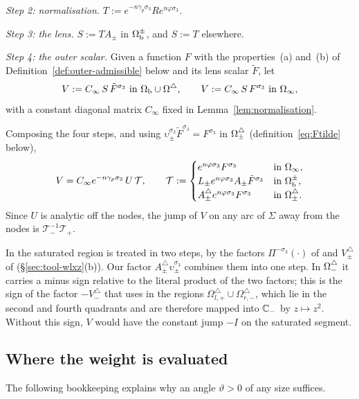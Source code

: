 \emph{Step 2: normalisation.} $T:=e^{-n\gamma_p\sigma_3}Re^{n\varphi\sigma_3}$.

\emph{Step 3: the lens.} $S:=TA_\pm$ in $\Omega_{\mathrm{b}}^\pm$, and $S:=T$ elsewhere.

\emph{Step 4: the outer scalar.} Given a function $F$ with the properties~(a) and~(b) of
Definition~\ref{def:outer-admissible} below and its lens scalar $\tilde F$, let
\begin{equation}\label{eq:V}
  V:=C_\infty\,S\,\tilde F^{\sigma_3}\ \text{in }\Omega_{\mathrm{b}}\cup\Omega^{\triangle},\qquad V:=C_\infty\,S\,F^{\sigma_3}\ \text{in }\Omega_{\infty},
\end{equation}
with a constant diagonal matrix $C_\infty$ fixed in Lemma~\ref{lem:normalisation}.

Composing the four steps, and using $\upsilon_\pm^{\sigma_3}\tilde F^{\sigma_3}=F^{\sigma_3}$ in $\Omega^{\triangle}_\pm$
(definition~\eqref{eq:Ftilde} below),
\begin{equation}\label{eq:VM}
  V=C_\infty e^{-n\gamma_p\sigma_3}\,U\,\mathcal T,\qquad
  \mathcal T:=\begin{cases}e^{n\varphi\sigma_3}F^{\sigma_3}&\text{in }\Omega_{\infty},\\
  L_\pm e^{n\varphi\sigma_3}A_\pm\tilde F^{\sigma_3}&\text{in }\Omega_{\mathrm{b}}^\pm,\\
  A^\triangle_\pm e^{n\varphi\sigma_3}F^{\sigma_3}&\text{in }\Omega^{\triangle}_\pm.\end{cases}
\end{equation}
Since $U$ is analytic off the nodes, the jump of $V$ on any arc of $\Sigma$ away from the nodes is $\mathcal T_-^{-1}\mathcal T_+$.

In \cite{WLXZ} the saturated region is treated in two steps, by the factors $\Pi^{-\sigma_3}(\cdot)$ of
\cite[(3.10)--(3.11)]{WLXZ} and $V^\triangle_\pm$ of \cite[(4.12)--(4.13)]{WLXZ} (\S\ref{sec:tool-wlxz}(b)). Our factor
$A^\triangle_\pm\upsilon_\pm^{\sigma_3}$ combines them into one step. In $\Omega^{\triangle}_-$ it carries a minus sign relative to
the literal product of the two factors; this is the sign of the factor $-V^\triangle_-$ that \cite[(4.12)]{WLXZ}
uses in the regions $\Omega^\triangle_{l,+}\cup\Omega^\triangle_{r,-}$, which lie in the second and fourth quadrants and
are therefore mapped into $\mathbb{C}_-$ by $z\mapsto z^2$. Without this sign, $V$ would have the constant jump $-I$ on the
saturated segment.

\subsection{Where the weight is evaluated}\label{sec:frame-where}
The following bookkeeping explains why an angle $\vartheta>0$ of any size suffices.

